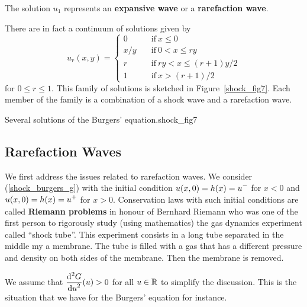 \begin{egg}
The solution $u_1$ represents an
{\bfseries expansive wave} or a
{\bfseries rarefaction wave}.

There are in fact a continuum of solutions given by
\[
u_r(x,y) = \begin{cases}
0 & \quad \text{if} \ x \leq 0 \\
x/y & \quad \text{if} \ 0 < x \leq ry \\
r & \quad \text{if} \ ry < x \leq (r+1)y/2 \\
1 & \quad \text{if} \ x > (r+1)/2 
\end{cases}
\]
for $0 \leq r \leq 1$.  This family of solutions is sketched in
Figure~\ref{shock_fig7}.  Each member of the family is a combination
of a shock wave and a rarefaction wave.
\end{egg}

{Several solutions of the Burgers' equation.}{shock_fig7}

\subsection{Rarefaction Waves} \label{subsectRarefW}

We first address the issues related to rarefaction waves.
We consider (\ref{shock_burgers_g}) with the initial condition
$\displaystyle u(x,0) = h(x) = u^-$ for $x<0$ and
$\displaystyle u(x,0) = h(x) = u^+$ for $x>0$.
Conservation laws with such initial conditions are called
{\bfseries Riemann problems}
in honour of Bernhard Riemann who was one of the first person to
rigorously study (using mathematics) the gas dynamics experiment
called ``shock tube''.  This experiment consists in a long tube
separated in the middle my a membrane.  The tube is filled with a gas
that has a different pressure and density on both sides of the
membrane.  Then the membrane is removed.

We assume that $\displaystyle \frac{\displaystyle \mathrm{d}^{2}{G}} {\displaystyle \mathrm{d}{u}^{2}}(u) > 0$ for all $u\in
\mathbb{R}$ to simplify the discussion.  This is the situation that we have
for the Burgers' equation for instance.

